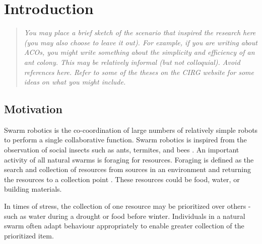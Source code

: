 
\chapter{Introduction}
\label{chap:introduction}
\pagestyle{headings}
\setcounter{page}{1}


\begin{quote}
	{\it You may place a brief sketch of the scenario that inspired the research here (you may also choose to leave it out). For example, if you are writing about ACOs, you might write something about the simplicity and efficiency of an ant colony. This may be relatively informal (but not colloquial). Avoid references here. Refer to some of the theses on the CIRG website for some ideas on what you might include.}
\end{quote}



\section{Motivation}
\label{sec:introduction:motivation}

Swarm robotics is the co-coordination of large numbers of  relatively simple robots to perform a single collaborative function. Swarm robotics is inspired from the observation of social insects such as ants, termites, and bees \cite{dorigo2004swarm}. An important activity of all natural swarms is foraging for resources. Foraging is defined as the search and collection of resources from sources in an environment and returning the resources to a collection point \cite{winfield2009foraging}. These resources could be food, water, or building materials. %

In times of stress, the collection of one resource may be prioritized over others - such as water during a drought or food before winter. Individuals in a natural swarm often adapt behaviour appropriately to enable greater collection of the prioritized item.

